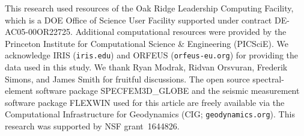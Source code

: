 \documentclass[extra,mreferee]{gji}
\begin{document}
\begin{acknowledgments}


This research used resources of the Oak Ridge Leadership Computing Facility, which is a DOE Office of Science User Facility supported under contract DE-AC05-00OR22725.
Additional computational resources were provided by the Princeton Institute for Computational Science \& Engineering (PICSciE).
We acknowledge IRIS ({\tt iris.edu}) and ORFEUS ({\tt orfeus-eu.org}) for providing the data used in this study. We thank Ryan Modrak, Ridvan Orsvuran, Frederik Simons, and James Smith for fruitful discussions.
The open source spectral-element software package SPECFEM3D\_GLOBE and the seismic measurement software package FLEXWIN used for this article are freely available via the Computational Infrastructure for Geodynamics (CIG; {\tt geodynamics.org}). This research was supported by NSF grant~1644826.

\end{acknowledgments}

\newpage


\end{document}
